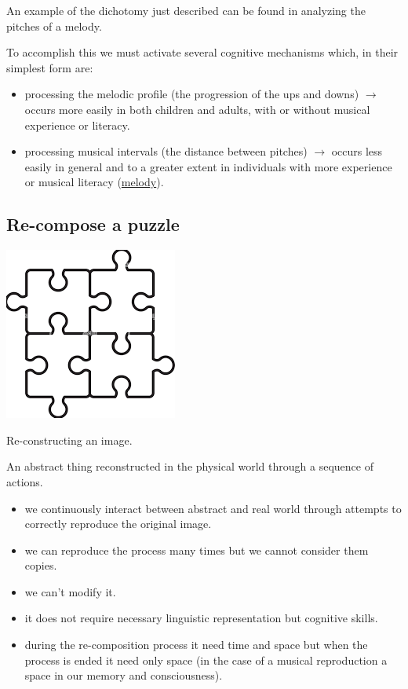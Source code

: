 An example of the dichotomy just described can be found in analyzing the pitches of a melody.

To accomplish this we must activate several cognitive mechanisms which, in their simplest form are:

\begin{itemize}
\item processing the melodic profile (the progression of the ups and downs)  \(\rightarrow\) occurs more easily in both children and adults, with or without musical experience or literacy.
\item processing musical intervals (the distance between pitches) \(\rightarrow\) occurs less easily in general and to a greater extent in individuals with more experience or musical literacy (\href{https://github.com/musicaecodice/EMC/blob/main/1_premises/suoni/veloso.mp3}{melody}).
\end{itemize}

\subsection{Re-compose a puzzle}\label{re-compose-a-puzzle}

\begin{center}
\includegraphics[scale=0.3]{../img/puzzle.png}
\end{center}

Re-constructing an image.

An abstract thing reconstructed in the physical world through a sequence of actions.

\begin{itemize}
\tightlist
\item we continuously interact between abstract and real world through attempts to correctly reproduce the original image.
\item we can reproduce the process many times but we cannot consider them copies.
\item we can't modify it.
\item it does not require necessary linguistic representation but cognitive skills.
\item during the re-composition process it need time and space but when the process is ended it need only space (in the case of a musical reproduction a space in our memory and consciousness).
\end{itemize}

